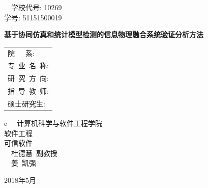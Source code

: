 \pagestyle{empty}

\hskip 4.75cm {{ ~~学校代号: {\large 10269}}}\\
\hspace*{\fill} {{ 学号: {\large 51151500019}}}

\vskip 2cm

\begin{center}
\end{center}

\vskip 3cm

\begin{center}
{\bf 基于协同仿真和统计模型检测的信息物理融合系统验证分析方法}
\end{center}

\vskip 3cm {\Large
\begin{center}
\begin{tabular}{l}
院\qquad\ \ \ 系:\\
专~业~名~称:\\
研~究~方~向:\\
指~导~教~师:\\
硕士研究生:
\end{tabular}
\begin{tabular}c
~~计算机科学与软件工程学院 \\
\hline  软件工程 \\
\hline  可信软件  \\
\hline ~~杜德慧\  副教授  \\
\hline ~~姜\ 凯强\   \\
\hline
\end{tabular}
\end{center}}

\vskip 30mm

\begin{center}
{\Large 2018年5月}
\end{center}
